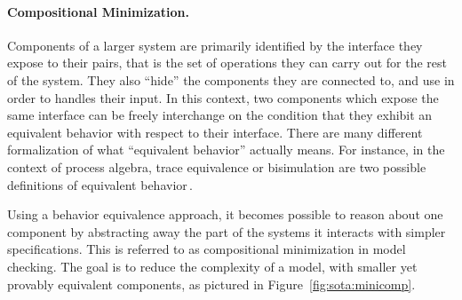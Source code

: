 \paragraph{Compositional Minimization.}
%
Components of a larger system are primarily identified by the interface they
expose to their pairs, that is the set of operations they can carry out for the
rest of the system.
%
They also ``hide'' the components they are connected to, and use in order to
handles their input.
%
In this context, two components which expose the same interface can be freely
interchange on the condition that they exhibit an equivalent behavior with
respect to their interface.
%
There are many different formalization of what ``equivalent behavior'' actually
means.
%
For instance, in the context of process algebra, trace equivalence or
bisimulation are two possible definitions of equivalent
behavior\,\cite{fokkink2013pa}.

Using a behavior equivalence approach, it becomes possible to reason about one
component by abstracting away the part of the systems it interacts with simpler
specifications.
%
This is referred to as compositional minimization in model checking.
%
The goal is to reduce the complexity of a model, with smaller yet provably
equivalent components, as pictured in Figure~\ref{fig:sota:minicomp}.

